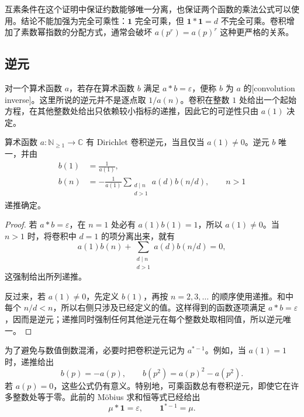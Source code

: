 互素条件在这个证明中保证约数能够唯一分离，也保证两个函数的乘法公式可以使用。结论不能加强为完全可乘性：\(\mathbf1\) 完全可乘，但 \(\mathbf1*\mathbf1=d\) 不完全可乘。卷积增加了素数幂指数的分配方式，通常会破坏 \(a(p^r)=a(p)^r\) 这种更严格的关系。

\subsection{逆元}
\label{b3:subsec:250203}

对一个算术函数 \(a\)，若存在算术函数 \(b\) 满足 \(a*b=\varepsilon\)，便称 \(b\) 为 \(a\) 的[convolution inverse]。这里所说的逆元并不是逐点取 \(1/a(n)\)。卷积在整数 \(1\) 处给出一个起始方程，在其他整数处给出只依赖较小指标的递推，因此它的可逆性只由 \(a(1)\) 决定。

\begin{proposition}\label{b3:prop:25-inverse}
算术函数 \(a:\mathbb N_{\ge1}\to\mathbb C\) 有 Dirichlet 卷积逆元，当且仅当 \(a(1)\ne0\)。逆元 \(b\) 唯一，并由
\begin{equation}\label{b3:eq:25-inverse-recursion}
 \begin{split}
 b(1)&=\frac1{a(1)},\\
 b(n)&=-\frac1{a(1)}
       \sum_{\substack{d\mid n\\d>1}}a(d)b(n/d),\qquad n>1
 \end{split}
\end{equation}
递推确定。
\end{proposition}
\begin{proof}
若 \(a*b=\varepsilon\)，在 \(n=1\) 处必有 \(a(1)b(1)=1\)，所以 \(a(1)\ne0\)。当 \(n>1\) 时，将卷积中 \(d=1\) 的项分离出来，就有
\[
 a(1)b(n)+\sum_{\substack{d\mid n\\d>1}}a(d)b(n/d)=0,
\]
这强制给出所列递推。

反过来，若 \(a(1)\ne0\)，先定义 \(b(1)\)，再按 \(n=2,3,\ldots\) 的顺序使用递推。和中每个 \(n/d<n\)，所以右侧只涉及已经定义的值。这样得到的函数逐项满足 \(a*b=\varepsilon\)，因而是逆元；递推同时强制任何其他逆元在每个整数处取相同值，所以逆元唯一。
\end{proof}

为了避免与数值倒数混淆，必要时把卷积逆元记为 \(a^{*-1}\)。例如，当 \(a(1)=1\) 时，递推给出
\[
 b(p)=-a(p),\qquad b(p^2)=a(p)^2-a(p^2).
\]
若 \(a(p)=0\)，这些公式仍有意义。特别地，可乘函数总有卷积逆元，即使它在许多整数处等于零。此前的 Möbius 求和恒等式已经给出
\[
 \mu*\mathbf1=\varepsilon,
 \qquad \mathbf1^{*-1}=\mu.
\]

